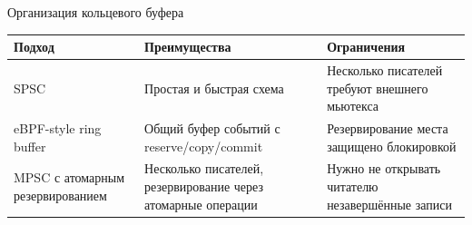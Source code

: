 \documentclass[aspectratio=169, 11pt]{beamer}
\begin{document}
\begin{frame}{Организация кольцевого буфера}
    \begin{table}
        \scriptsize
        \begin{tabular}{p{} p{} p{}}
            \toprule
            Подход & Преимущества & Ограничения \\
            \midrule
            SPSC &
            Простая и быстрая схема &
            Несколько писателей требуют внешнего мьютекса \\
            \addlinespace
            eBPF-style ring buffer &
            Общий буфер событий с reserve/copy/commit &
            Резервирование места защищено блокировкой \\
            \addlinespace
            MPSC с атомарным резервированием &
            Несколько писателей, резервирование через атомарные операции &
            Нужно не открывать читателю незавершённые записи \\
            \bottomrule
        \end{tabular}
    \end{table}
\end{frame}
\end{document}
